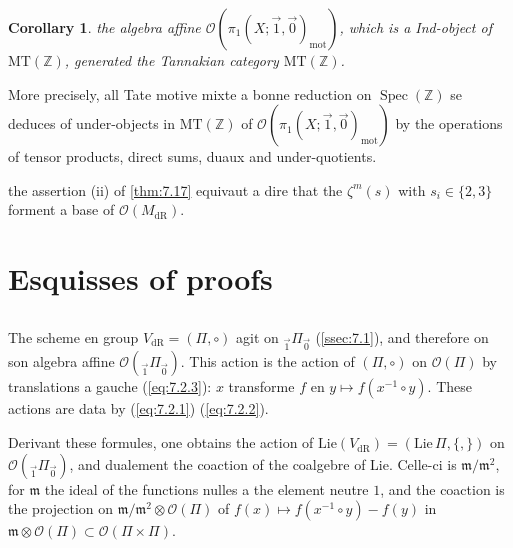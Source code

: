 \documentclass[11pt,a4paper]{article}
\theoremstyle{plain}
\newtheorem{corollary}[theorem]{Corollary}
\theoremstyle{definition}
\DeclareMathOperator{\Spec}{Spec}
\newcommand{\Z}{\mathbb{Z}}
\newcommand{\dR}{\mathrm{dR}}
\newcommand{\mot}{\mathrm{mot}}
\newcommand{\MT}{\mathrm{MT}}
\begin{document}
\begin{corollary}\label{thm:7.18}
the algebra affine $\mathcal{O}(\pi_1(X;\vec{1},\vec{0})_{\mot})$, which is a Ind-object of $\MT(\Z)$, generated the Tannakian category $\MT(\Z)$.
\end{corollary}

More precisely, all Tate motive mixte a bonne reduction on $\Spec(\Z)$ se deduces of under-objects in $\MT(\Z)$ of $\mathcal{O}(\pi_1(X;\vec{1},\vec{0})_{\mot})$ by the operations of tensor products, direct sums, duaux and under-quotients.

the assertion (ii) of \ref{thm:7.17} equivaut a dire that the $\zeta^m(s)$ with $s_i \in \{2,3\}$ forment a base of $\mathcal{O}(M_{\dR})$.

\section{Esquisses of proofs}\label{sec:8}

\subsection{}\label{ssec:8.1}

The scheme en group $V_{\dR} = (\Pi, \circ)$ agit on ${}_{\vec{1}}\Pi_{\vec{0}}$ (\ref{ssec:7.1}), and therefore on son algebra affine $\mathcal{O}({}_{\vec{1}}\Pi_{\vec{0}})$. This action is the action of $(\Pi, \circ)$ on $\mathcal{O}(\Pi)$ by translations a gauche (\ref{eq:7.2.3}): $x$ transforme $f$ en $y \mapsto f(x^{-1} \circ y)$. These actions are data by (\ref{eq:7.2.1}) (\ref{eq:7.2.2}).

Derivant these formules, one obtains the action of $\mathrm{Lie}(V_{\dR}) = (\mathrm{Lie}\,\Pi, \{,\})$ on $\mathcal{O}({}_{\vec{1}}\Pi_{\vec{0}})$, and dualement the coaction of the coalgebre of Lie. Celle-ci is $\mathfrak{m}/\mathfrak{m}^2$, for $\mathfrak{m}$ the ideal of the functions nulles a the element neutre $1$, and the coaction is the projection on $\mathfrak{m}/\mathfrak{m}^2 \otimes \mathcal{O}(\Pi)$ of $f(x) \mapsto f(x^{-1} \circ y) - f(y)$ in $\mathfrak{m} \otimes \mathcal{O}(\Pi) \subset \mathcal{O}(\Pi \times \Pi)$.
\end{document}
